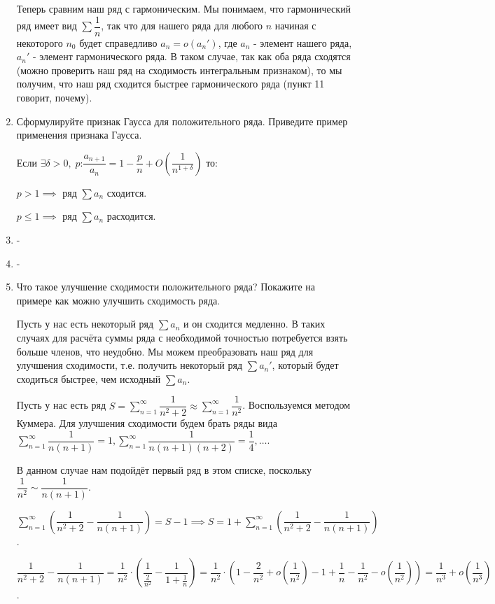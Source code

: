 \documentclass[a4paper]{article}
\begin{document}
\begin{enumerate}
        Теперь сравним наш ряд с гармоническим. Мы понимаем, что гармонический ряд имеет вид $\sum \dfrac{1}{n}$, так что для нашего ряда для любого $n$ начиная с некоторого $n_0$ будет справедливо $a_n = o(a_n')$, где $a_n$ - элемент нашего ряда, $a_n'$ - элемент гармонического ряда. В таком случае, так как оба ряда сходятся (можно проверить наш ряд на сходимость интегральным признаком), то мы получим, что наш ряд сходится быстрее гармонического ряда (пункт 11 говорит, почему).
        
        \item Сформулируйте признак Гаусса для положительного ряда. Приведите пример применения признака Гаусса.

        Если $\exists \delta > 0,\; p$:$ \dfrac{a_{n+1}}{a_n} = 1 - \dfrac{p}{n} + O\left(\dfrac{1}{n^{1 + \delta}}\right) $
        то:

        $p > 1 \implies$ ряд $\sum a_n$ сходится.

        $p \leq 1 \implies$ ряд $\sum a_n$ расходится.
        \item -
        \item -
        \item Что такое улучшение сходимости положительного ряда? Покажите на примере как можно улучшить сходимость ряда.

        Пусть у нас есть некоторый ряд $\sum a_n$ и он сходится медленно. В таких случаях для расчёта суммы ряда с необходимой точностью потребуется взять больше членов, что неудобно. Мы можем преобразовать наш ряд для улучшения сходимости, т.е. получить некоторый ряд $\sum a_n'$, который будет сходиться быстрее, чем исходный $\sum a_n$.
       	\begin{example}
            Пусть у нас есть ряд $S = \sum_{n = 1}^{\infty} \dfrac{1}{n^2 + 2} \approx \sum_{n = 1}^{\infty} \dfrac{1}{n^2}$. Воспользуемся  методом Куммера. Для улучшения сходимости будем брать ряды вида $\sum_{n = 1}^{\infty} \dfrac{1}{n(n+1)} = 1, \sum_{n = 1}^{\infty} \dfrac{1}{n(n+1)(n+2)} = \dfrac{1}{4}, \dots$. 
            
            В данном случае нам подойдёт первый ряд в этом списке, поскольку $\dfrac{1}{n^2} \sim \dfrac{1}{n(n+1)}$.
            
            $\sum_{n = 1}^{\infty} \left( \dfrac{1}{n^2 + 2} - \dfrac{1}{n(n + 1)} \right) = S - 1 \implies S = 1 + \sum_{n = 1}^{\infty} \left( \dfrac{1}{n^2 + 2} - \dfrac{1}{n(n + 1)} \right)$.
             
            $\dfrac{1}{n^2 + 2} - \dfrac{1}{n(n + 1)} = \dfrac{1}{n^2} \cdot \left( \dfrac{1}{\frac{2}{n^2}} - \dfrac{1}{1 + \frac{1}{n}} \right) = \dfrac{1}{n^2} \cdot \left( 1 - \dfrac{2}{n^2} + o \left( \dfrac{1}{n^2} \right) - 1 + \dfrac{1}{n} - \dfrac{1}{n^2} - o \left( \dfrac{1}{n^2} \right) \right) = \dfrac{1}{n^3} + o \left( \dfrac{1}{n^3} \right)$.
         

\end{example}
\end{enumerate}
\end{document}
